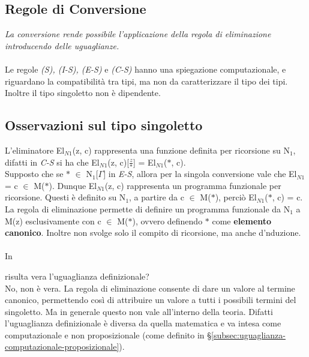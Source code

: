 \documentclass[10pt,a4paper, italian]{book}
\begin{document}
{{\subsection{Regole di Conversione}
\label{subsec:conversione}
\begin{prooftree}
\end{prooftree}
\textit{La conversione rende possibile l'applicazione della regola di eliminazione introducendo delle uguaglianze.}
\\\\
Le regole \textit{(S), (I-S), (E-S)} e \textit{(C-S)}  hanno una spiegazione computazionale, e riguardano la compatibilit\`a tra tipi, ma non da caratterizzare il tipo dei tipi.\\ Inoltre il tipo singoletto non \`e dipendente.
\subsection{Osservazioni sul tipo singoletto}
\label{subsec:osservazioni}
L'eliminatore El$_{N1}$(z, c) rappresenta una funzione definita per ricorsione su N$_1$, difatti in \textit{C-S} si ha che El$_{N1}$(z, c)[$\frac{z}{\ast}$] = El$_{N1}$($\ast$, c).\\
Supposto che se $\ast$ $\in$ N$_1$[$\Gamma$] in \textit{E-S}, allora per la singola conversione vale che El$_{N1}$ = c $\in$ M($\ast$).
Dunque El$_{N1}$(z, c) rappresenta un programma funzionale per ricorsione. Questi \`e definito su N$_1$, a partire da c $\in$ M($\ast$), perci\`o El$_{N1}$($\ast$, c) = c.\\
La regola di eliminazione permette di definire un programma funzionale da N$_1$ a M(z) esclusivamente con c $\in$ M($\ast$), ovvero definendo $\ast$ come \textbf{elemento canonico}. Inoltre non svolge solo il compito di ricorsione, ma anche d'nduzione.
\\\\
In \begin{prooftree}
\end{prooftree}
risulta vera l'uguaglianza definizionale?\\
No, non \`e vera. La regola di eliminazione consente di dare un valore al termine canonico, permettendo cos\`i di attribuire un valore a tutti i possibili termini del singoletto. Ma in generale questo non vale all'interno della teoria. Difatti l'uguaglianza definizionale \`e diversa da quella matematica e va intesa come computazionale e non proposizionale (come definito in \S \ref{subsec:uguaglianza-computazionale-proposizionale}).

}}
\end{document}

